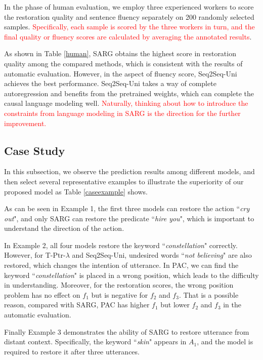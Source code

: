 In the phase of human evaluation, we employ three experienced workers to score the restoration quality and sentence fluency separately on 200 randomly selected samples. \textcolor{red}{Specifically, each sample is scored by the three workers in turn, and the final quality or fluency scores are calculated by averaging the annotated results}.

As shown in Table \ref{human}, SARG obtains the highest score in restoration quality among the compared methods, which is consistent with the results of automatic evaluation. However, in the aspect of fluency score, Seq2Seq-Uni achieves the best performance. Seq2Seq-Uni takes a way of complete autoregression and benefits from the pretrained weights, which can complete the causal language modeling well. 
\textcolor{red}{Naturally, thinking about how to introduce the constraints from language modeling in SARG is the direction for the further improvement.}

\subsection{Case Study}\label{casestudy}

In this subsection, we observe the prediction results among different models, and then select several representative examples to illustrate the superiority of our proposed model as Table \ref{caseexample} shows.

As can be seen in Example 1, the first three models can restore the action ``\textit{cry out}", and only SARG can restore the predicate ``\textit{hire you}", which is important to understand the direction of the action. 

In Example 2, all four models restore the keyword ``\textit{constellation}" correctly. However, for T-Ptr-$\lambda$ and Seq2Seq-Uni, undesired words ``\textit{not believing}" are also restored, which changes the intention of utterance. In PAC, we can find the keyword ``\textit{constellation}" is placed in a wrong position, which leads to the difficulty in understanding. Moreover, for the restoration scores, the wrong position problem has no effect on $f_1$ but is negative for $f_2$ and $f_3$. That is a possible reason, compared with SARG, PAC has higher $f_1$ but lower $f_2$ and $f_3$ in the automatic evaluation.

Finally Example 3 demonstrates the ability of SARG to restore utterance from distant context. Specifically, the keyword ``\textit{skin}" appears in $A_1$, and the model is required to restore it after three utterances.

